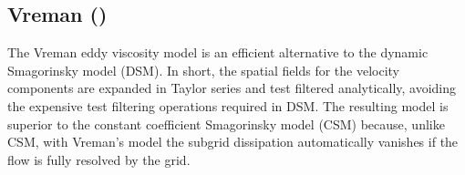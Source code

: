 \documentclass[11pt]{book}
\begin{document}
\clearpage

\subsection{Vreman (\texorpdfstring{}{vreman})}
\label{Vreman_model}

The Vreman eddy viscosity model \cite{Vreman:2004} is an efficient alternative to the dynamic Smagorinsky model (DSM).  In short, the spatial fields for the velocity components are expanded in Taylor series and test filtered analytically, avoiding the expensive test filtering operations required in DSM.  The resulting model is superior to the constant coefficient Smagorinsky model (CSM) because, unlike CSM, with Vreman's model the subgrid dissipation automatically vanishes if the flow is fully resolved by the grid.
\end{document}
